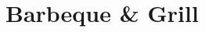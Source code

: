 \documentclass[../../cookbook.tex]{subfiles}
\begin{document}
\chapter{Barbeque \& Grill}
\minitoc%
\clearpage





\end{document}
